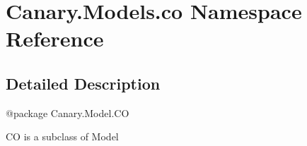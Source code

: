 \hypertarget{namespace_canary_1_1_models_1_1co}{\section{Canary.\-Models.\-co Namespace Reference}
\label{namespace_canary_1_1_models_1_1co}
}


\subsection{Detailed Description}
\begin{DoxyVerb}@package Canary.Model.CO

CO is a subclass of Model
\end{DoxyVerb}
 